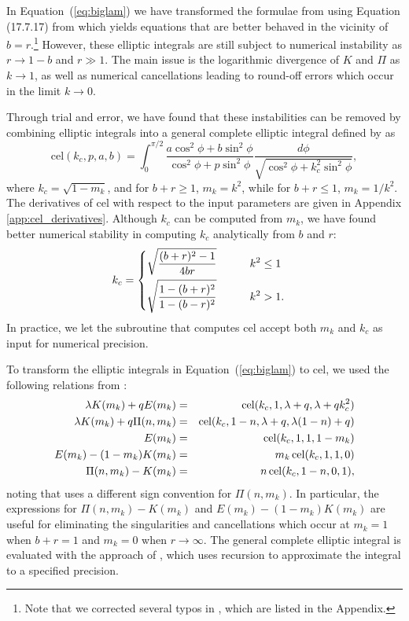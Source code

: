 \documentclass[modern,trackchanges]{aastex63}
\begin{document}
In Equation~(\ref{eq:biglam}) we have transformed the formulae from \citet{MandelAgol2002} using
Equation (17.7.17) from \citet{Abramowitz1970} which yields equations that are better
behaved in the vicinity of $b=r$.\footnote{Note that we corrected several typos
in \citet{MandelAgol2002}, which are listed in the Appendix.}  However, these elliptic
integrals are still subject to numerical instability as $r \rightarrow 1-b$ and $r \gg 1$.
The main issue is the logarithmic divergence of $K$ and $\Pi$ as $k \rightarrow 1$, as
well as numerical cancellations leading to round-off errors which occur in the
limit $k \rightarrow 0$.

Through trial and error, we have found that these instabilities can be removed by combining
elliptic integrals into a general complete elliptic integral defined by \citet{Bulirsch1969} as
\begin{equation}\label{eq:cel}
\mathrm{cel}(k_c,p,a,b) = \int_0^{\pi/2} \frac{a\cos^2{\phi} + b\sin^2{\phi}}{\cos^2{\phi}+p\sin^2{\phi}} \frac{d\phi}{\sqrt{\cos^2{\phi}+k_c^2\sin^2{\phi}}},
\end{equation}
where $k_c = \sqrt{1-m_k}$, and for $b+r \ge 1$,
$m_k=k^2$, while for $b+r \le 1$, $m_k=1/k^2$.  The derivatives of
$\mathrm{cel}$ with respect to the input parameters are given in Appendix \ref{app:cel_derivatives}.
Although $k_c$ can be computed from
$m_k$, we have found better numerical stability in computing $k_c$ analytically
from $b$ and $r$:
\begin{align}
    k_c &=
    \begin{dcases}
     \sqrt{\frac{(b+r)^2-1}{4br}} & \qquad k^2 \le 1\\
     \sqrt{\frac{1-(b+r)^2}{1-(b-r)^2}} & \qquad k^2 > 1.
   \end{dcases}
\end{align}
In practice, we let the subroutine that computes $\mathrm{cel}$ accept both
$m_k$ and $k_c$ as input for numerical precision.

To transform the elliptic integrals in Equation~(\ref{eq:biglam}) to $\mathrm{cel}$,
we used the following relations from \citet{Bulirsch1969}:
\begin{eqnarray} \label{eq:cel_identities}
\lambda K(m_k) + q E(m_k) &=& {\rm cel}(k_c,1,\lambda+q,\lambda+q k_c^2)\\
\lambda K(m_k) + q \Pi(n,m_k) &=& {\rm cel}(k_c,1-n,\lambda+q,\lambda (1-n) + q)\\
E(m_k) &=& {\rm cel}(k_c,1,1,1-m_k)\\
E(m_k)-(1-m_k)K(m_k) &=& m_k \, {\rm cel}(k_c,1,1,0)\\
\Pi(n,m_k)-K(m_k)  &=& n \, {\rm cel}(k_c,1-n,0,1),
\end{eqnarray}
noting that \citet{Bulirsch1969} uses a different sign convention for $\Pi(n,m_k)$.
In particular, the expressions for $\Pi(n,m_k)-K(m_k)$ and $E(m_k)-(1-m_k)K(m_k)$ are useful for eliminating
the singularities and cancellations which occur at $m_k=1$ when $b+r=1$ and $m_k=0$ when
$r \rightarrow \infty$.  The general complete elliptic integral is evaluated
with the approach of \citet{Bartky1938}, which uses recursion to approximate the
integral to a specified precision.
\end{document}
